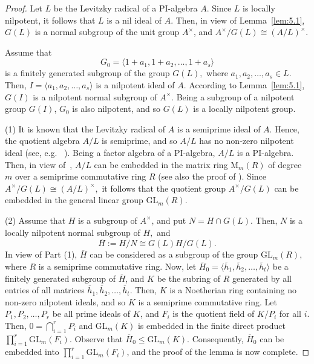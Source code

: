 \documentclass{amsart}
\theoremstyle{definition}
\begin{document}
\begin{proof} Let $L$ be the Levitzky radical of a PI-algebra $A$. Since $L$ is locally nilpotent, it follows that $L$ is a nil ideal of $A$. Then, in view of Lemma~\ref{lem:5.1}, $G(L)$ is a normal subgroup of the unit group $A^\times$, and $A^\times/G(L)\cong (A/L)^\times.$

Assume that $$G_0=\langle 1+a_1,1+a_2,\ldots, 1+a_s\rangle$$
is a finitely generated subgroup of the group $G(L),$ where $a_1,a_2,\ldots, a_s\in L.$ Then, $I=\langle a_1,a_2,\ldots, a_s\rangle$ is a nilpotent ideal of $A.$ According to Lemma~\ref{lem:5.1}, $G(I)$ is a nilpotent normal subgroup of $A^\times$.  Being a subgroup of a nilpotent group $G(I)$, $G_0$ is also nilpotent, and so $G(L)$ is a locally nilpotent group.
	
(1) It is known that the Levitzky radical of $A$ is a semiprime ideal of $A$. Hence, the quotient algebra $A/L$ is semiprime, and so $A/L$ has no non-zero nilpotent ideal (see, e.g. ~\cite[(10.16) Proposition]{Bo_Lam_2001}). Being a factor algebra of a $\mathrm{PI}$-algebra, $A/L$ is a $\mathrm{PI}$-algebra. Then, in view of~\cite[\S 6, Theorem 2]{Bo_Jacobson_1964}, $A/L$ can be embedded in the matrix ring $\mathrm{M}_m(R)$ of degree $m$ over a semiprime commutative ring $R$ (see also the proof of \cite[Theorem~2]{Pa_Procesi_1966}). Since $A^\times/G(L)\cong (A/L)^\times,$ it follows that the quotient group $A^\times/G(L)$ can be embedded in the general linear group $\mathrm{GL}_m(R).$
	
(2) Assume that $H$ is a subgroup of $A^\times$, and put $N=H\cap G(L)$. Then, $N$ is a locally nilpotent normal subgroup of $H,$ and  
$$\overline{H}:=H/N\cong G(L)H/G(L).$$ 
In view of Part (1), $\overline{H}$ can be considered as a subgroup of the group $\mathrm{GL}_m(R),$ where $R$ is a semiprime commutative ring. Now, let $\overline{H}_0=\langle \overline{h}_1,\overline{h}_2,\ldots, \overline{h}_t\rangle$ be a finitely generated subgroup of $\overline{H}$, and $K$  be the subring of $R$ generated by all entries of all matrices $\overline{h}_1,\overline{h}_2,\ldots, \overline{h}_t.$ Then, $K$ is a Noetherian ring containing no  non-zero nilpotent ideals, and so $K$ is a semiprime commutative ring. Let $P_1, P_2,\ldots, P_r$ be all prime ideals of $K$, and $F_i$ is the quotient field of $K/P_i$ for all $i$.  Then, $0=\bigcap_{i=1}^r P_i$ and $\mathrm{GL}_m(K)$ is embedded in the finite direct product $\prod_{i=1}^{r}\mathrm{GL}_m(F_i).$ Observe that $\overline{H}_0\le \mathrm{GL}_m(K).$ Consequently, $\overline{H}_0$ can be embedded into $\prod_{i=1}^{r}\mathrm{GL}_m(F_i)$, and  the proof of the lemma is now complete. 
\end{proof}
\end{document}
